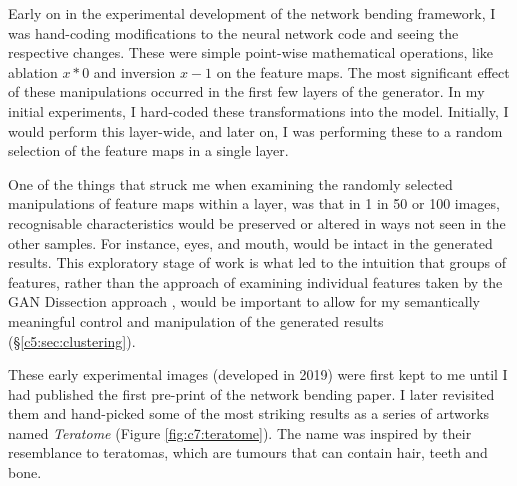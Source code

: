 Early on in the experimental development of the network bending framework, I was hand-coding modifications to the neural network code and seeing the respective changes. 
These were simple point-wise mathematical operations, like ablation $x*0$ and inversion $x-1$ on the feature maps. 
The most significant effect of these manipulations occurred in the first few layers of the generator. 
In my initial experiments, I hard-coded these transformations into the model. Initially, I would perform this layer-wide, and later on, I was performing these to a random selection of the feature maps in a single layer. 

One of the things that struck me when examining the randomly selected manipulations of feature maps within a layer, was that in 1 in 50 or 100 images, recognisable characteristics would be preserved or altered in ways not seen in the other samples. 
For instance, eyes, and mouth, would be intact in the generated results. This exploratory stage of work is what led to the intuition that groups of features, rather than the approach of examining individual features taken by the GAN Dissection approach \citep{bau2019semantic}, would be important to allow for my semantically meaningful control and manipulation of the generated results (\S \ref{c5:sec:clustering}). 

These early experimental images (developed in 2019) were first kept to me until I had published the first pre-print of the network bending paper.
I later revisited them and hand-picked some of the most striking results as a series of artworks named \textit{Teratome} \citeyearpar{broad2020teratome} (Figure \ref{fig:c7:teratome}). 
The name was inspired by their resemblance to teratomas, which are tumours that can contain hair, teeth and bone. 

